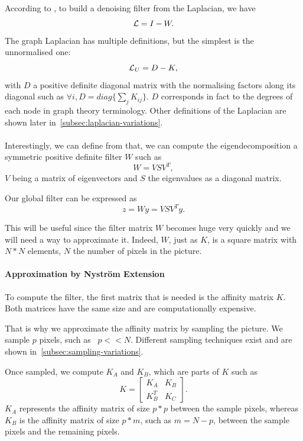 \paragraph{}
According to \cite{modern_tour_2013}, to build a denoising filter from the Laplacian, we have
\[\operatorname{\mathcal{L}} = I - W.\]
The graph Laplacian has multiple definitions, but the simplest is the unnormalised one:
\[\operatorname{\mathcal{L}}_U = D - K,\]
with \(D\) a positive definite diagonal matrix with the normalising factors along its diagonal such as \(\forall i, D = diag\{\sum_j K_{ij}\}\).
\(D\) corresponds in fact to the degrees of each node in graph theory terminology.
Other definitions of the Laplacian are shown later in~\ref{subsec:laplacian-variations}.

\paragraph{}
Interestingly, we can define from \cite{glide_2014} that, we can compute the eigendecomposition a symmetric positive definite filter \(W\) such as
\[W = VSV^T,\]
\(V\) being a matrix of eigenvectors and \(S\) the eigenvalues as a diagonal matrix.

Our global filter can be expressed as
\[z = Wy = VSV^Ty.\]

This will be useful since the filter matrix \(W\) becomes huge very quickly and we will need a way to approximate it.
Indeed, \(W\), just as \(K\), is a square matrix with \(N*N\) elements, \(N\) the number of pixels in the picture.

\paragraph{Approximation by Nystr\"om Extension}

To compute the filter, the first matrix that is needed is the affinity matrix \(K\).
Both matrices have the same size and are computationally expensive.

That is why we approximate the affinity matrix by sampling the picture.
We sample \(p\) pixels, such as  \(p << N\).
Different sampling techniques exist and are shown in~\ref{subsec:sampling-variations}.

Once sampled, we compute \(K_A\) and \(K_B\), which are parts of \(K\) such as
\[
 K = \begin{bmatrix}
  K_A & K_B \\
  K_B^T & K_C
 \end{bmatrix}.
\]
\(K_A\) represents the affinity matrix of size \(p*p\) between the sample pixels, whereas \(K_B\) is the affinity matrix of size \(p*m\), such as \(m = N-p\), between the sample pixels and the remaining pixels.

